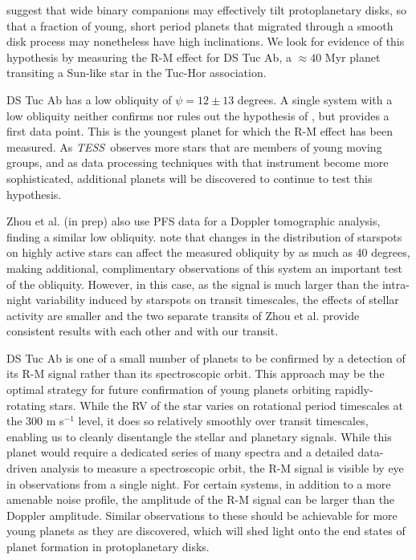 \documentclass[twocolumn]{aastex63}
\newcommand{\tess}{{\it TESS}}
\begin{document}
\citet{Batygin12} suggest that wide binary companions may effectively tilt protoplanetary disks, so that a fraction of young, short period planets that migrated through a smooth disk process may nonetheless have high inclinations. 
We look for evidence of this hypothesis by measuring the R-M effect for DS Tuc Ab, a $\approx 40$ Myr planet transiting a Sun-like star in the Tuc-Hor association. 

DS Tuc Ab has a low obliquity of $\psi = 12 \pm 13$ degrees. A single system with a low obliquity neither confirms nor rules out the hypothesis of \citet{Batygin12}, but provides a first data point.
This is the youngest planet for which the R-M effect has been measured. As \tess\ observes more stars that are members of young moving groups, and as data processing techniques with that instrument become more sophisticated, additional planets will be discovered to continue to test this hypothesis.

Zhou et al. (in prep) also use PFS data for a Doppler tomographic analysis, finding a similar low obliquity. \citet{Oshagh12} note that changes in the distribution of starspots on highly active stars can affect the measured obliquity by as much as 40 degrees, making additional, complimentary observations of this system an important test of the obliquity. 
However, in this case, as the signal is much larger than the intra-night variability induced by starspots on transit timescales, the effects of stellar activity are smaller and the two separate transits of Zhou et al. provide consistent results with each other and with our transit.

DS Tuc Ab is one of a small number of planets to be confirmed by a detection of its R-M signal rather than its spectroscopic orbit. 
This approach may be the optimal strategy for future confirmation of young planets orbiting rapidly-rotating stars. 
While the RV of the star varies on rotational period timescales at the 300 m s$^{-1}$ level, it does so relatively smoothly over transit timescales, enabling us to cleanly disentangle the stellar and planetary signals.
While this planet would require a dedicated series of many spectra and a detailed data-driven analysis to measure a spectroscopic orbit, the R-M signal is visible by eye in observations from a single night.
For certain systems, in addition to a more amenable noise profile, the amplitude of the R-M signal can be larger than the Doppler amplitude. 
Similar observations to these should be achievable for more young planets as they are discovered, which will shed light onto the end states of planet formation in protoplanetary disks.
\end{document}
